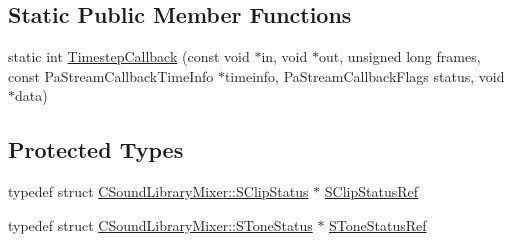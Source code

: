 \subsection*{Static Public Member Functions}
\begin{DoxyCompactItemize}
\item 
static int \hyperlink{classCSoundLibraryMixer_a1d04553aa93769b8bff4bb5c8b7bdfa1}{Timestep\+Callback} (const void $\ast$in, void $\ast$out, unsigned long frames, const Pa\+Stream\+Callback\+Time\+Info $\ast$timeinfo, Pa\+Stream\+Callback\+Flags status, void $\ast$data)
\end{DoxyCompactItemize}
\subsection*{Protected Types}
\begin{DoxyCompactItemize}
\item 
typedef struct \hyperlink{structCSoundLibraryMixer_1_1SClipStatus}{C\+Sound\+Library\+Mixer\+::\+S\+Clip\+Status} $\ast$ \hyperlink{classCSoundLibraryMixer_a2f004304483c7a121cb477d218b9226f}{S\+Clip\+Status\+Ref}
\item 
typedef struct \hyperlink{structCSoundLibraryMixer_1_1SToneStatus}{C\+Sound\+Library\+Mixer\+::\+S\+Tone\+Status} $\ast$ \hyperlink{classCSoundLibraryMixer_ad772f44e33c3fce7e970b5057bdf81b9}{S\+Tone\+Status\+Ref}
\end{DoxyCompactItemize}

